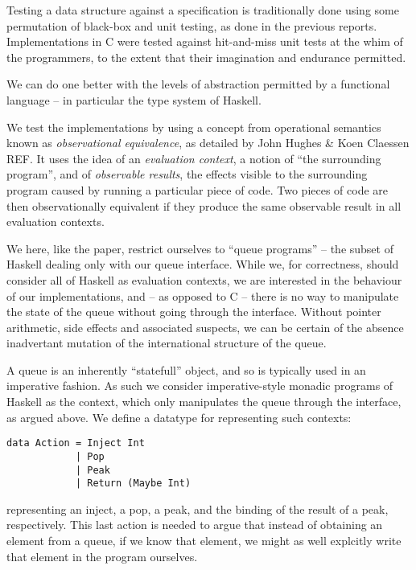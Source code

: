 \documentclass[a4paper, 12pt]{article}
\begin{document}
Testing a data structure against a specification is traditionally done
using some permutation of black-box and unit testing, as done in the
previous reports. Implementations in C were tested against
hit-and-miss unit tests at the whim of the programmers, to the extent
that their imagination and endurance permitted.

We can do one better with the levels of abstraction permitted by a
functional language -- in particular the type system of Haskell.

We test the implementations by using a concept from operational
semantics known as \emph{observational equivalence}, as detailed by
John Hughes \& Koen Claessen REF. It uses the idea of an
\emph{evaluation context}, a notion of ``the surrounding program'',
and of \emph{observable results}, the effects visible to the
surrounding program caused by running a particular piece of code. Two
pieces of code are then observationally equivalent if they produce the
same observable result in all evaluation contexts.

We here, like the paper, restrict ourselves to ``queue programs'' --
the subset of Haskell dealing only with our queue interface. While we,
for correctness, should consider all of Haskell as evaluation
contexts, we are interested in the behaviour of our implementations,
and -- as opposed to C -- there is no way to manipulate the state of
the queue without going through the interface. Without pointer
arithmetic, side effects and associated suspects, we can be certain of
the absence inadvertant mutation of the international structure of the
queue.

A queue is an inherently ``statefull'' object, and so is typically
used in an imperative fashion. As such we consider imperative-style
monadic programs of Haskell as the context, which only manipulates the
queue through the interface, as argued above. We define a datatype for
representing such contexts:

\begin{lstlisting}
data Action = Inject Int
            | Pop
            | Peak
            | Return (Maybe Int)
\end{lstlisting}

representing an inject, a pop, a peak, and the binding of the result
of a peak, respectively. This last action is needed to argue that
instead of obtaining an element from a queue, if we know that element,
we might as well explcitly write that element in the program
ourselves.
\end{document}
